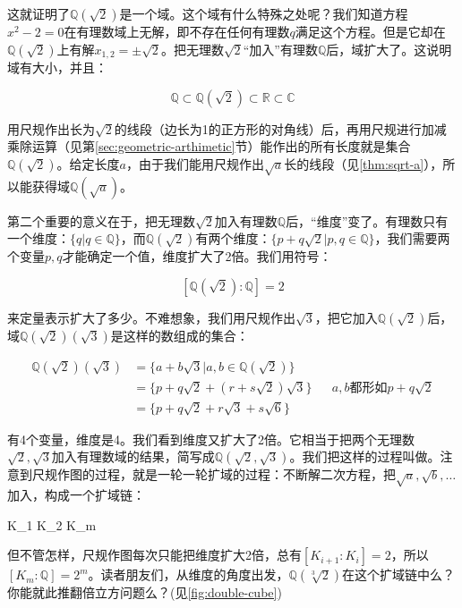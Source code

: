 这就证明了$\mathbb{Q}(\sqrt{2})$是一个域。这个域有什么特殊之处呢？我们知道方程$x^2 - 2 = 0$在有理数域上无解，即不存在任何有理数$q$满足这个方程。但是它却在$\mathbb{Q}(\sqrt{2})$上有解$x_{1, 2} = \pm \sqrt{2}$。把无理数$\sqrt{2}$“加入”有理数$\mathbb{Q}$后，域扩大了。这说明域有大小，并且：

\[
\mathbb{Q} \subset \mathbb{Q}(\sqrt{2}) \subset \mathbb{R} \subset \mathbb{C}
\]

用尺规作出长为$\sqrt{2}$的线段（边长为1的正方形的对角线）后，再用尺规进行加减乘除运算（见第\ref{sec:geometric-arthimetic}节）能作出的所有长度就是集合$\mathbb{Q}(\sqrt{2})$。给定长度$a$，由于我们能用尺规作出$\sqrt{a}$长的线段（见\cref{thm:sqrt-a}），所以能获得域$\mathbb{Q}(\sqrt{a})$。

第二个重要的意义在于，把无理数$\sqrt{2}$加入有理数$\mathbb{Q}$后，“维度”变了。有理数只有一个维度：$\{q | q \in \mathbb{Q}\}$，而$\mathbb{Q}(\sqrt{2})$有两个维度：$\{p + q \sqrt{2} | p, q \in \mathbb{Q}\}$，我们需要两个变量$p, q$才能确定一个值，维度扩大了2倍。我们用符号：

\[
[\mathbb{Q}(\sqrt{2}) : \mathbb{Q}] = 2
\]

来定量表示扩大了多少。不难想象，我们用尺规作出$\sqrt{3}$，把它加入$\mathbb{Q}(\sqrt{2})$后，域$\mathbb{Q}(\sqrt{2})(\sqrt{3})$是这样的数组成的集合：

\begin{align*}
  \mathbb{Q}(\sqrt{2})(\sqrt{3}) &= \{a + b \sqrt{3} | a, b \in \mathbb{Q}(\sqrt{2}) \} \\
  &= \{p + q \sqrt{2} + (r + s\sqrt{2})\sqrt{3} \} && a, b \text{都形如} p + q\sqrt{2} \\
  &= \{p + q \sqrt{2} + r\sqrt{3} + s\sqrt{6} \}
\end{align*}

有4个变量，维度是4。我们看到维度又扩大了2倍。它相当于把两个无理数$\sqrt{2}, \sqrt{3}$加入有理数域的结果，简写成$\mathbb{Q}(\sqrt{2}, \sqrt{3})$。我们把这样的过程叫做。注意到尺规作图的过程，就是一轮一轮扩域的过程：不断解二次方程，把$\sqrt{a}, \sqrt{b}, \dotsc$加入，构成一个扩域链：

\be
{} \subset K_1 \subset K_2 \subset \dotsb \subset K_m
\label{eq:tower-of-geometric-field-ext}
\ee

但不管怎样，尺规作图每次只能把维度扩大2倍，总有$[K_{i+1} : K_i] = 2$，所以$[K_m : \mathbb{Q}] = 2^m$。读者朋友们，从维度的角度出发，$\mathbb{Q}(\sqrt[3]{2})$在这个扩域链中么？你能就此推翻倍立方问题么？(见\cref{fig:double-cube})

